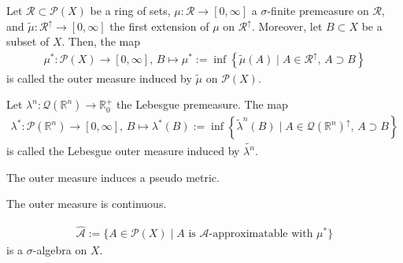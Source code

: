 \begin{definition}
    Let \(\mathcal{R} \subset \mathcal{P}(X)\) be a ring of sets, \(\mu: \mathcal{R} \rightarrow [0, \infty]\) a \(\sigma\)-finite premeasure on \(\mathcal{R}\), and \(\tilde{\mu}: \mathcal{R}^\uparrow \rightarrow [0, \infty]\) the first extension of \(\mu\) on \(\mathcal{R}^\uparrow\). Moreover, let \(B \subset X\) be a subset of \(X\). Then, the map
    \begin{align}
        \mu^*: \mathcal{P}(X) \rightarrow [0, \infty], \, B \mapsto \mu^* := \inf \left\{ \tilde\mu(A) \mid A \in \mathcal{R}^\uparrow, \, A \supset B \right\}
    \end{align}
    is called the outer measure induced by \(\tilde{\mu}\) on \(\mathcal{P}(X)\).
\end{definition}

\begin{proposition}

\end{proposition}

\begin{proposition}

\end{proposition}

\begin{definition}
    Let \(\lambda^n: \mathcal{Q}(\mathbb{R}^n) \rightarrow \mathbb{R}_0^+\) the Lebesgue premeasure. The map
    \begin{align}
        \lambda^*: \mathcal{P}(\mathbb{R}^n) \rightarrow [0, \infty], \, B \mapsto \lambda^*(B):= \inf \left\{ \tilde{\lambda}^n (B) \mid A \in \mathcal{Q}(\mathbb{R}^n)^\uparrow, \, A \supset B \right\}
    \end{align}
    is called the Lebesgue outer measure induced by \(\tilde{\lambda^n}\).
\end{definition}

\begin{definition}
    
\end{definition}

\begin{proposition}
    The outer measure induces a pseudo metric.
\end{proposition}

\begin{proposition}
    The outer measure is continuous.
\end{proposition}

\begin{definition}
    
\end{definition}

\begin{theorem}
    \begin{align}
        \hat{\mathcal{A}} := \{ A \in \mathcal{P}(X) \mid \text{\(A\) is \(\mathcal{A}\)-approximatable with \(\mu^*\)} \}
    \end{align}
    is a \(\sigma\)-algebra on \(X\).
\end{theorem}